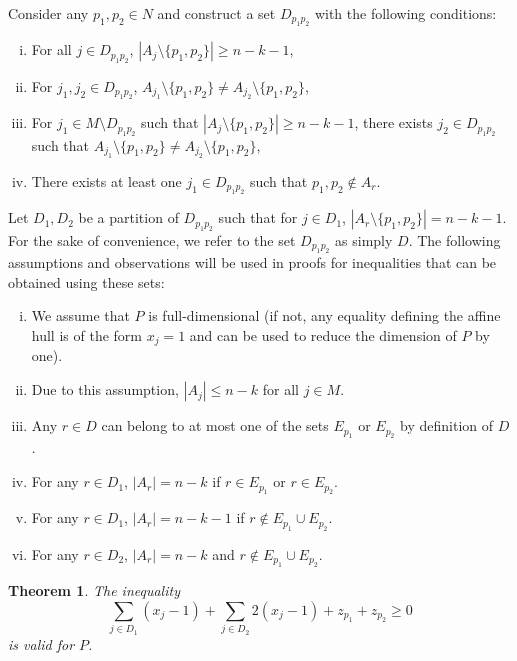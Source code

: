 \documentclass[12pt]{article}
\newcommand{\sm}{\setminus}
\newtheorem{thm}{Theorem}
\begin{document}
Consider any $p_1,p_2 \in N$ and construct a set $D_{p_1p_2}$ with the following conditions:
\begin{enumerate}[(i)]
\item For all $j \in D_{p_1p_2}$, $|A_j \sm \{p_1,p_2\}| \geq n-k-1$,
\item For $j_1,j_2 \in D_{p_1p_2}$, $A_{j_1} \sm \{p_1,p_2\} \neq A_{j_2} \sm \{p_1,p_2\}$,
\item For $j_1 \in M \sm D_{p_1p_2}$ such that $|A_j \sm \{p_1,p_2\}| \geq n-k-1$, there exists $j_2 \in D_{p_1p_2}$ such that $A_{j_1} \sm \{p_1,p_2\} \neq A_{j_2} \sm \{p_1,p_2\}$,
\item There exists at least one $j_1 \in D_{p_1p_2}$ such that $p_1,p_2 \notin A_r$.
\end{enumerate}
Let $D_1,D_2$ be a partition of $D_{p_1p_2}$ such that for $j \in D_1$, $|A_r \sm \{p_1,p_2\}| = n-k-1$. For the sake of convenience, we refer to the set $D_{p_1p_2}$ as simply $D$. The following assumptions and observations will be used in proofs for inequalities that can be obtained using these sets:
\begin{enumerate}[(i)]
\item We assume that $P$ is full-dimensional (if not, any equality defining the affine hull is of the form $x_j = 1$ and can be used to reduce the dimension of $P$ by one).
\item Due to this assumption, $|A_j| \leq n-k$ for all $j \in M$.
\item Any $r \in D$ can belong to at most one of the sets $E_{p_1}$ or $E_{p_2}$ by definition of $D$.
\item For any $r \in D_1$, $|A_r| = n-k$ if $r \in E_{p_1}$ or $r \in E_{p_2}$.
\item For any $r \in D_1$, $|A_r| = n-k-1$ if $r \notin E_{p_1} \cup E_{p_2}$.
\item For any $r \in D_2$, $|A_r| = n-k$ and $r \notin E_{p_1} \cup E_{p_2}$.
\end{enumerate}
\begin{thm}
The inequality
\begin{equation}
\sum_{j \in D_1} (x_j - 1) + \sum_{j \in D_2} 2(x_j - 1) + z_{p_1} + z_{p_2} \geq 0
\label{eq:vi3}
\end{equation}
is valid for $P$.
\end{thm}
\end{document}
